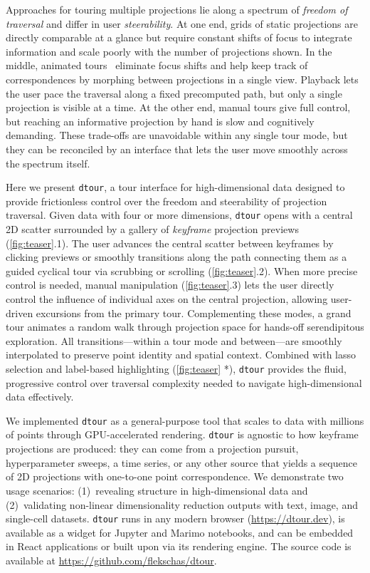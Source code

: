 \documentclass{vgtc}
\newcommand{\dtour}{\texorpdfstring{\texttt{dtour}\xspace}{dtour}}
\begin{document}
Approaches for touring multiple projections lie along a spectrum of \emph{freedom of traversal} and differ in user \emph{steerability}. At one end, grids of static projections are directly comparable at a glance but require constant shifts of focus to integrate information and scale poorly with the number of projections shown. In the middle, animated tours~\cite{swayne2001ggobi,wickham2011tourr} eliminate focus shifts and help keep track of correspondences by morphing between projections in a single view. Playback lets the user pace the traversal along a fixed precomputed path, but only a single projection is visible at a time. At the other end, manual tours give full control, but reaching an informative projection by hand is slow and cognitively demanding. These trade-offs are unavoidable within any single tour mode, but they can be reconciled by an interface that lets the user move smoothly across the spectrum itself.

Here we present \dtour{}, a tour interface for high-dimensional data designed to provide frictionless control over the freedom and steerability of projection traversal. Given data with four or more dimensions, \dtour{} opens with a central 2D scatter surrounded by a gallery of \emph{keyframe} projection previews (\autoref{fig:teaser}.1). The user advances the central scatter between keyframes by clicking previews or smoothly transitions along the path connecting them as a guided cyclical tour via scrubbing or scrolling (\autoref{fig:teaser}.2). When more precise control is needed, manual manipulation (\autoref{fig:teaser}.3) lets the user directly control the influence of individual axes on the central projection, allowing user-driven excursions from the primary tour. Complementing these modes, a grand tour animates a random walk through projection space for hands-off serendipitous exploration. All transitions---within a tour mode and between---are smoothly interpolated to preserve point identity and spatial context. 
Combined with lasso selection and label-based highlighting (\autoref{fig:teaser} *), \dtour{} provides the fluid, progressive control over traversal complexity needed to navigate high-dimensional data effectively.

We implemented \dtour{} as a general-purpose tool that scales to data with millions of points through GPU-accelerated rendering. \dtour{} is agnostic to how keyframe projections are produced: they can come from a projection pursuit, hyperparameter sweeps, a time series, or any other source that yields a sequence of 2D projections with one-to-one point correspondence. We demonstrate two usage scenarios: (1)~revealing structure in high-dimensional data and (2)~validating non-linear dimensionality reduction outputs with text, image, and single-cell datasets.  \dtour{} runs in any modern browser (\url{https://dtour.dev}), is available as a widget for Jupyter and Marimo notebooks, and can be embedded in React applications or built upon via its rendering engine. The source code is available at \url{https://github.com/flekschas/dtour}.
\end{document}

